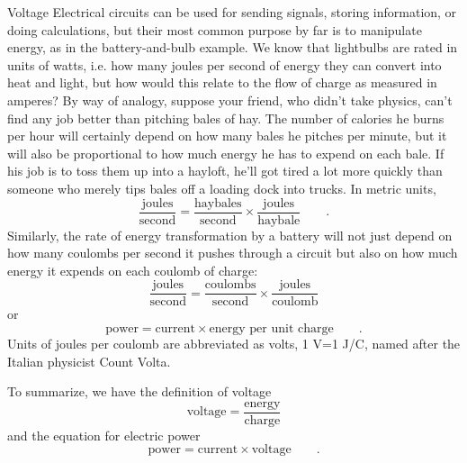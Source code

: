 \begin{envsubsection}{Voltage}
	Electrical circuits can be used for sending signals, storing
	information, or doing calculations, but their most common
	purpose by far is to manipulate energy, as in the battery-and-bulb
	example. We know that lightbulbs are
	rated in units of watts, i.e. how many joules per second of
	energy they can convert into heat and light, but how would
	this relate to the flow of charge as measured in amperes? By
	way of analogy, suppose your friend, who didn't take
	physics, can't find any job better than pitching bales of
	hay. The number of calories he burns per hour will certainly
	depend on how many bales he pitches per minute, but it will
	also be proportional to how much energy he has to expend
	on each bale. If his job is to toss them up into a
	hayloft, he'll got tired a lot more quickly than someone
	who merely tips bales off a loading dock into trucks. In metric units,
	\begin{equation*}
		\frac{\text{joules}}{\text{second}}
		 = \frac{\text{haybales}}{\text{second}}
			 \times \frac{\text{joules}}{\text{haybale}}    \qquad   .  
	\end{equation*}
	Similarly, the rate of energy transformation by a battery
	will not just depend on how many coulombs per second it
	pushes through a circuit but also on how much energy
	it expends on each coulomb of charge:
	\begin{equation*}
		\frac{\text{joules}}{\text{second}}
		 = \frac{\text{coulombs}}{\text{second}}
			 \times \frac{\text{joules}}{\text{coulomb}}
	\end{equation*}
	\noindent or
	\begin{equation*}
			\text{power}	 = 	\text{current} \times \text{energy per unit charge}   \qquad   .  
	\end{equation*}
	Units of joules per coulomb are abbreviated as volts, 1 V=1 J/C, named after the Italian
	physicist Count Volta. 

	To summarize, we have the definition of voltage
	\begin{equation*}
		\text{voltage} = \frac{\text{energy}}{\text{charge}}
	\end{equation*}
	and the equation for electric power
	\begin{equation*}
		\text{power} = \text{current} \times \text{voltage} \qquad .
	\end{equation*}



\end{envsubsection}
